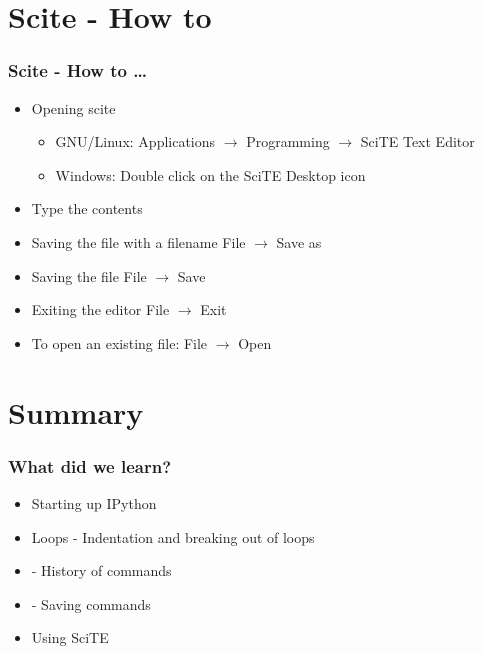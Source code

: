 \documentclass[14pt,compress]{beamer}
\newcommand{\kwrd}[1]{ \texttt{\textbf{\color{blue}{#1}}}  }
\begin{document}
\section{Scite - How to}
\begin{frame}[fragile]
  \frametitle{Scite - How to \ldots}
  \begin{itemize}
  \item Opening scite
    \begin{itemize}
    \item GNU/Linux: \alert{Applications} $\rightarrow$ \alert{Programming} $\rightarrow$ \alert{SciTE Text Editor}
    \item Windows: Double click on the \alert{SciTE} Desktop icon
    \end{itemize}
  \item Type the contents
  \item Saving the file with a filename \alert{File $\rightarrow$ Save as}
  \item Saving the file  \alert{File $\rightarrow$ Save}
  \item Exiting the editor  \alert{File $\rightarrow$ Exit}
  \item To open an existing file: \alert{File $\rightarrow$ Open}
  \end{itemize}
\end{frame}

\section{Summary}
\begin{frame}[fragile]
  \frametitle{What did we learn?}
  \begin{itemize}
    \item Starting up IPython
    \item Loops - Indentation and breaking out of loops
    \item \kwrd{\%hist} - History of commands
    \item \kwrd{\%save} - Saving commands 
    \item Using SciTE
  \end{itemize}
\end{frame}
\end{document}
